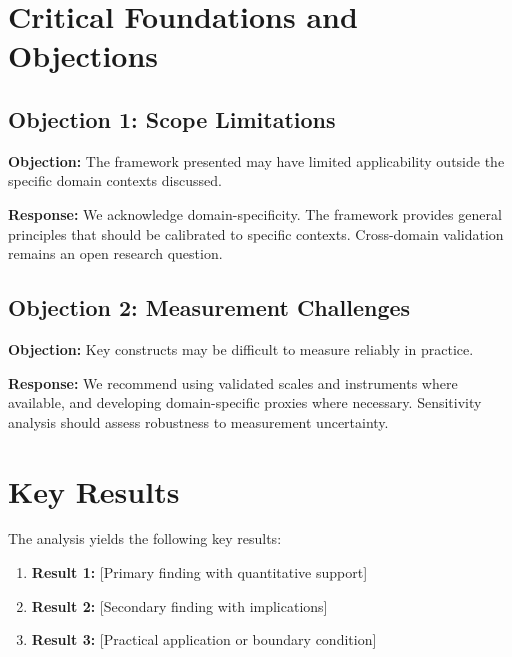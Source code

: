 \section{Critical Foundations and Objections}
\label{sec:nnn-foundations}

\subsection{Objection 1: Scope Limitations}

\textbf{Objection:} The framework presented may have limited applicability
outside the specific domain contexts discussed.

\textbf{Response:} We acknowledge domain-specificity. The framework provides
general principles that should be calibrated to specific contexts. Cross-domain
validation remains an open research question.

\subsection{Objection 2: Measurement Challenges}

\textbf{Objection:} Key constructs may be difficult to measure reliably in
practice.

\textbf{Response:} We recommend using validated scales and instruments where
available, and developing domain-specific proxies where necessary. Sensitivity
analysis should assess robustness to measurement uncertainty.




\section{Key Results}
\label{sec:nnn-results}

The analysis yields the following key results:

\begin{enumerate}
    \item \textbf{Result 1:} [Primary finding with quantitative support]
    \item \textbf{Result 2:} [Secondary finding with implications]
    \item \textbf{Result 3:} [Practical application or boundary condition]
\end{enumerate}


